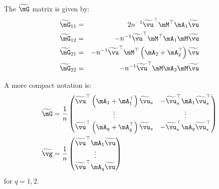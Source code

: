 \documentclass[english,12pt]{book}\usepackage[]{graphicx}\usepackage[]{xcolor}
\begin{document}
The $\widetilde{\mG}$ matrix is given by:
\begin{eqnarray*}
\widetilde{\mG}_{11} &=& 2n^{-1}\widetilde{\vu}^\top\mM^\top\mA_1\widetilde{\vu} \\
\widetilde{\mG}_{12} &=& -n^{-1}\widetilde{\vu}^\top\mM^\top\mA_1\mM\widetilde{\vu} \\
\widetilde{\mG}_{21} &=& -n^{-1}\widetilde{\vu}^\top\mM^\top\left(\mA_2 + \mA_2^\top\right)\widetilde{\vu} \\
\widetilde{\mG}_{22}&=& -n^{-1}\widetilde{\vu}^\top\mM\mA_2\mM\widetilde{\vu}
\end{eqnarray*}

A more compact notation is:
\begin{equation*}
\begin{aligned}
\widetilde{\mG} & = \frac{1}{n}
                    \begin{pmatrix}
                      \widetilde{\vu}^\top\left(\mA_1 + \mA^\top_1\right)\widetilde{\vu}_s & - \widetilde{\vu}^\top_s\mA_1\widetilde{\vu}^\top_s \\
                      \vdots & \vdots \\
                      \widetilde{\vu}^\top\left(\mA_q + \mA^\top_q\right)\widetilde{\vu}_s & - \widetilde{\vu}^\top_s\mA_q\widetilde{\vu}^\top_s
                    \end{pmatrix} \\
\widetilde{\vg} & = \frac{1}{n}\begin{pmatrix}
                                \widetilde{\vu}^\top\mA_1\widetilde{\vu} \\
                                \vdots \\
                                \widetilde{\vu}^\top\mA_q\widetilde{\vu}
                                \end{pmatrix}
\end{aligned}
\end{equation*}
%
for $q = 1, 2$.

% 
% 
\end{document}
